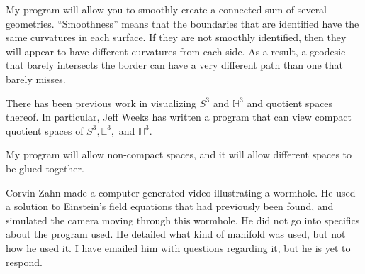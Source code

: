 \documentclass[12pt]{amsart}
\begin{document}
My program will allow you to smoothly create a connected sum of several geometries. ``Smoothness'' means that the boundaries that are identified have the same curvatures in each surface. If they are not smoothly identified, then they will appear to have different curvatures from each side. As a result, a geodesic that barely intersects the border can have a very different path than one that barely misses.





There has been previous work in visualizing $S^3$ and $\mathbb{H}^3$ and quotient spaces thereof. In particular, Jeff Weeks has written a program that can view compact quotient spaces of $S^3, \mathbb{E}^3,$ and $\mathbb{H}^3$. \cite{CurvedSpaces}

My program will allow non-compact spaces, and it will allow different spaces to be glued together.




Corvin Zahn made a computer generated video illustrating a wormhole. He used a solution to Einstein's field equations that had previously been found, and simulated the camera moving through this wormhole. He did not go into specifics about the program used. He detailed what kind of manifold was used, but not how he used it. I have emailed him with questions regarding it, but he is yet to respond. \cite{spacetimetravel}







\end{document}
